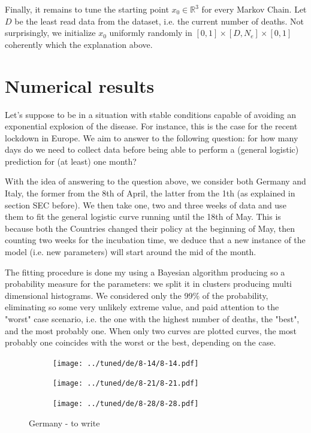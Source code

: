 \documentclass[8pt]{article}
\begin{document}
Finally, it remains to tune the starting point $x_0 \in \mathbb{R}^3$
for every Markov Chain. Let $D$ be
the least read data from the dataset, i.e. the current
number of deaths.
Not surprisingly, we initialize $x_0$ uniformly randomly in
$[0, 1] \times [D, N_e] \times [0,1]$ coherently which the explanation above.


\section{Numerical results}
Let's suppose to be in
a situation with stable conditions capable of avoiding an exponential
explosion of the disease. For instance, this is the case for the recent
lockdown in Europe.
We aim to answer to the following question:
for how many days do we need to collect data before being able 
to perform a (general logistic) prediction for (at least) one month?


With the idea of answering to the question above, we consider both Germany
and Italy, the former from the 8th of April, the latter from the 1th
(as explained in section SEC before). We then take one, two and three weeks
of data and use them to fit the general logistic curve running until the
18th of May. This is because both the Countries
changed their policy at the beginning of May, then counting 
two weeks for the incubation time, we deduce that 
a new instance of the model (i.e. new parameters)
will start around the mid of the month.


The fitting procedure is done my using a Bayesian algorithm
producing so a probability measure for the parameters: we split it in
clusters producing multi dimensional histograms. We considered
only the 99\% of the probability, eliminating so some very
unlikely extreme value, and paid attention to
the "worst" case scenario, i.e. the one with the highest number of deaths, 
the "best", and the most probably one. 
When only two curves are plotted curves,
the most probably one coincides with the worst or the best, depending on the
case.


\begin{figure}[h!]
  \centering
  \begin{subfigure}[b]{0.45\linewidth}
  \texttt{[image: ../tuned/de/8-14/8-14.pdf]}
  \end{subfigure}
  \begin{subfigure}[b]{0.45\linewidth}
    \texttt{[image: ../tuned/de/8-21/8-21.pdf]}
  \end{subfigure}
  \begin{subfigure}[b]{0.45\linewidth}
  \texttt{[image: ../tuned/de/8-28/8-28.pdf]}
  \end{subfigure}
	\caption{Germany - to write}
\end{figure}
\end{document}
